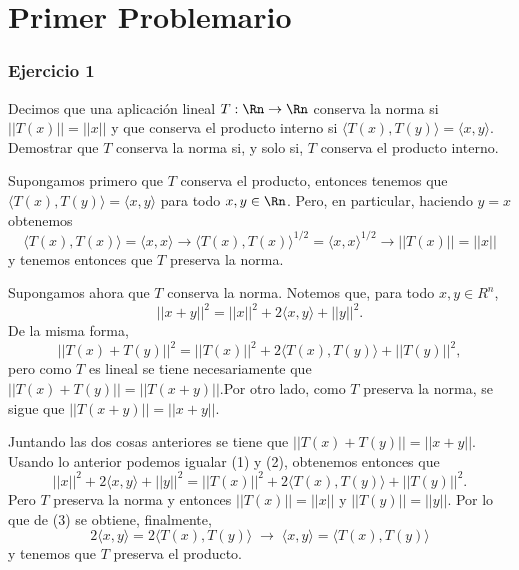 

\thispagestyle{plain}
\chapter*{Primer Problemario}
\subsection*{Ejercicio 1}
	Decimos que una aplicación lineal $T : \Rn \rightarrow \Rn$ conserva la norma si $||T(x)|| = ||x||$ y que conserva el producto interno si $\langle T(x),T(y) \rangle = \langle x,y \rangle$. Demostrar que $T$ conserva la norma si, y solo si, $T$ conserva el producto interno.
	\begin{sol}
		Supongamos primero que $T$ conserva el producto, entonces tenemos que $\langle T(x),T(y) \rangle = \langle x,y\rangle $ para todo $x,y \in \Rn$. Pero, en particular, haciendo $y=x$ obtenemos
		$$ \langle T(x),T(x)\rangle  = \langle x,x\rangle  \rightarrow \langle T(x),T(x)\rangle ^{1/2} = \langle x,x\rangle ^{1/2} \rightarrow ||T(x)|| =||x||$$
		y tenemos entonces que $T$ preserva la norma.
		
		Supongamos ahora que $T$ conserva la norma. Notemos que, para todo $x,y \in R^n$,
		\[ ||x+y||^2 = ||x||^2 + 2 \langle x,y \rangle + ||y||^2. \tag{1} \]
		De la misma forma,       
		\[ ||T(x)+T(y)||^2 = ||T(x)||^2 + 2 \langle T(x),T(y) \rangle + ||T(y)||^2, \tag{2} \]
		pero como $T$ es lineal se tiene necesariamente que $||T(x) + T(y)|| = ||T(x+y)||$.Por otro lado, como $T$ preserva la norma, se sigue que $||T(x+y)||= ||x+y||$. 
		
		Juntando las dos cosas anteriores se tiene que $||T(x) + T(y)|| = ||x+y||$. Usando lo anterior podemos igualar (1) y (2), obtenemos entonces que
		\[||x||^2 + 2 \langle x,y \rangle + ||y||^2 =  ||T(x)||^2 + 2 \langle T(x),T(y) \rangle + ||T(y)||^2.\tag{3} \]
		Pero $T$ preserva la norma y entonces $||T(x)|| = ||x||$ y $||T(y)|| = ||y||$. Por lo que de (3) se obtiene, finalmente,
		$$ 2 \langle x,y \rangle =  2 \langle T(x),T(y) \rangle \; \rightarrow \; \langle x,y \rangle = \langle T(x),T(y) \rangle$$
		y tenemos que $T$ preserva el producto.
	\end{sol}

